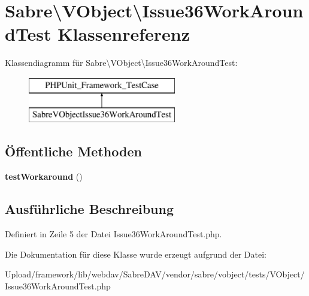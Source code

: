 \hypertarget{class_sabre_1_1_v_object_1_1_issue36_work_around_test}{}\section{Sabre\textbackslash{}V\+Object\textbackslash{}Issue36\+Work\+Around\+Test Klassenreferenz}
\label{class_sabre_1_1_v_object_1_1_issue36_work_around_test}
Klassendiagramm für Sabre\textbackslash{}V\+Object\textbackslash{}Issue36\+Work\+Around\+Test\+:\begin{figure}[H]
\begin{center}
\leavevmode
\includegraphics[height=2.000000cm]{class_sabre_1_1_v_object_1_1_issue36_work_around_test}
\end{center}
\end{figure}
\subsection*{Öffentliche Methoden}
\begin{DoxyCompactItemize}
\item 
\mbox{\label{class_sabre_1_1_v_object_1_1_issue36_work_around_test_a41ea53b1a60ed6c73b8034642a9d98fa}} 
{\bfseries test\+Workaround} ()
\end{DoxyCompactItemize}


\subsection{Ausführliche Beschreibung}


Definiert in Zeile 5 der Datei Issue36\+Work\+Around\+Test.\+php.



Die Dokumentation für diese Klasse wurde erzeugt aufgrund der Datei\+:\begin{DoxyCompactItemize}
\item 
Upload/framework/lib/webdav/\+Sabre\+D\+A\+V/vendor/sabre/vobject/tests/\+V\+Object/Issue36\+Work\+Around\+Test.\+php\end{DoxyCompactItemize}
